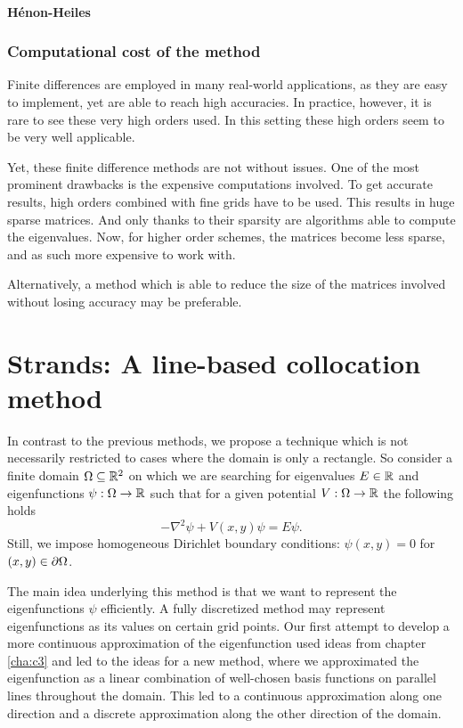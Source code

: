 \paragraph{Hénon-Heiles} 


\subsubsection{Computational cost of the method}

Finite differences are employed in many real-world applications, as they are easy to implement, yet are able to reach high accuracies. In practice, however, it is rare to see these very high orders used. In this setting these high orders seem to be very well applicable.

Yet, these finite difference methods are not without issues. One of the most prominent drawbacks is the expensive computations involved. To get accurate results, high orders combined with fine grids have to be used. This results in huge sparse matrices. And only thanks to their sparsity are algorithms able to compute the eigenvalues. Now, for higher order schemes, the matrices become less sparse, and as such more expensive to work with.

Alternatively, a method which is able to reduce the size of the matrices involved without losing accuracy may be preferable.

\section{Strands: A line-based collocation method}\label{sec:c4_strands}

In contrast to the previous methods, we propose a technique which is not necessarily restricted to cases where the domain is only a rectangle. So consider a finite domain $\Omega \subseteq \mathbb{R}^2$ on which we are searching for eigenvalues $E \in \mathbb{R}$ and eigenfunctions $\psi: \Omega \to \mathbb{R}$ such that for a given potential $V : \Omega \to \mathbb{R}$ the following holds
\begin{equation}\label{equ:c4_schrodinger_equation_new_method}
    -\nabla^2 \psi + V(x, y) \psi = E \psi\text{.}
\end{equation}
Still, we impose homogeneous Dirichlet boundary conditions: $\psi(x, y) = 0$ for $(x, y) \in \partial\Omega$.

The main idea underlying this method is that we want to represent the eigenfunctions $\psi$ efficiently. A fully discretized method may represent eigenfunctions as its values on certain grid points. Our first attempt to develop a more continuous approximation of the eigenfunction used ideas from chapter \ref{cha:c3} and led to the ideas for a new method, where we approximated the eigenfunction as a linear combination of well-chosen basis functions on parallel lines throughout the domain. This led to a continuous approximation along one direction and a discrete approximation along the other direction of the domain.

